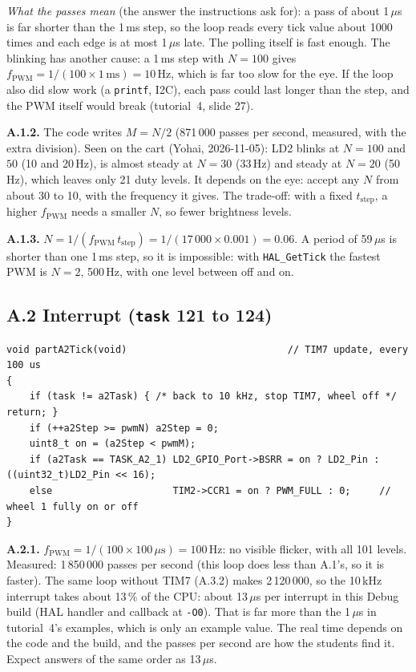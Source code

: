 \documentclass[11pt,a4paper]{article}
\newcommand{\lv}[1]{\texttt{#1}}                 %
\begin{document}
\emph{What the passes mean} (the answer the instructions ask for): a pass of about 1\,$\mu$s is far shorter than
the 1\,ms step, so the loop reads every tick value about 1000 times and each edge is at most 1\,$\mu$s late. The
polling itself is fast enough. The blinking has another cause: a 1\,ms step with $N = 100$ gives $f_\mathrm{PWM} =
1/(100 \times 1\,\mathrm{ms}) = 10$\,Hz, which is far too slow for the eye. If the loop also did slow work (a
\texttt{printf}, I2C), each pass could last longer than the step, and the PWM itself would break (tutorial~4,
slide 27).

\textbf{A.1.2.} The code writes $M = N/2$ (871\,000 passes per second, measured, with the extra division). Seen on the cart (Yohai, 2026-11-05): LD2 blinks at $N = 100$ and $50$
(10 and 20\,Hz), is almost steady at $N = 30$ (33\,Hz) and steady at $N = 20$ (50\,Hz), which leaves only 21 duty
levels. It depends on the eye: accept any $N$ from about 30 to 10, with the frequency it gives. The trade-off: with a fixed $t_\mathrm{step}$, a higher
$f_\mathrm{PWM}$ needs a smaller $N$, so fewer brightness levels.

\textbf{A.1.3.} $N = 1/(f_\mathrm{PWM}\,t_\mathrm{step}) = 1/(17\,000 \times 0.001) = 0.06$. A period of 59\,$\mu$s is
shorter than one 1\,ms step, so it is impossible: with \texttt{HAL\_GetTick} the fastest PWM is $N = 2$, 500\,Hz,
with one level between off and on.

\subsection*{A.2 Interrupt (\lv{task} 121 to 124)}
\begin{lstlisting}
void partA2Tick(void)                            // TIM7 update, every 100 us
{
    if (task != a2Task) { /* back to 10 kHz, stop TIM7, wheel off */ return; }
    if (++a2Step >= pwmN) a2Step = 0;
    uint8_t on = (a2Step < pwmM);
    if (a2Task == TASK_A2_1) LD2_GPIO_Port->BSRR = on ? LD2_Pin : ((uint32_t)LD2_Pin << 16);
    else                     TIM2->CCR1 = on ? PWM_FULL : 0;     // wheel 1 fully on or off
}
\end{lstlisting}
\textbf{A.2.1.} $f_\mathrm{PWM} = 1/(100 \times 100\,\mu\mathrm{s}) = 100$\,Hz: no visible flicker, with all 101
levels. Measured: 1\,850\,000 passes per second (this loop does less than A.1's, so it is faster). The same loop
without TIM7 (A.3.2) makes 2\,120\,000, so the 10\,kHz interrupt takes about 13\,\% of the CPU: about 13\,$\mu$s per
interrupt in this Debug build (HAL handler and callback at \texttt{-O0}). That is far more than the 1\,$\mu$s in
tutorial~4's examples, which is only an example value. The real time depends on the code and the build, and the
passes per second are how the students find it. Expect answers of the same order as 13\,$\mu$s.
\end{document}
